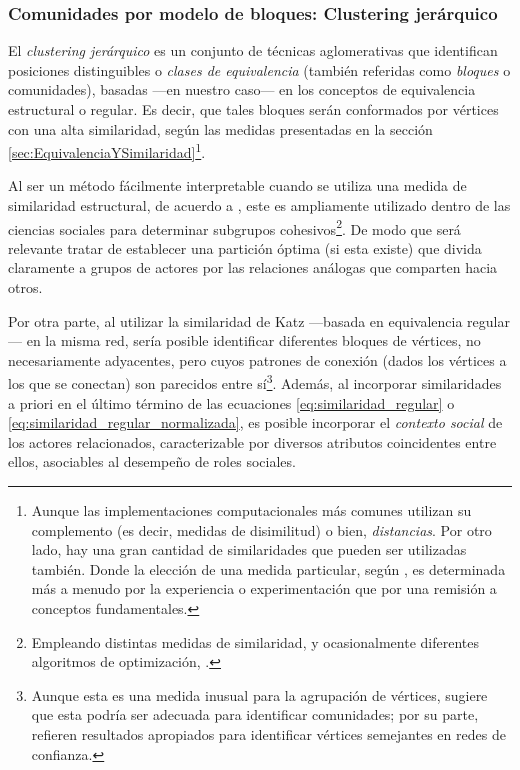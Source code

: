 \documentclass[letterpaper, 11pt]{book}
\theoremstyle{definition}
\theoremstyle{remark}
\begin{document}
\subsubsection{Comunidades por modelo de bloques: Clustering jerárquico}
\label{sec:ClasesEquivalentes}

El \emph{clustering jerárquico} es un conjunto de técnicas aglomerativas que identifican posiciones distinguibles o \emph{clases de equivalencia} (también referidas como \emph{bloques} o comunidades), basadas ---en nuestro caso--- en los conceptos de equivalencia estructural o regular. 
Es decir, que tales bloques serán conformados por vértices con una alta similaridad, según las medidas presentadas en la sección \ref{sec:EquivalenciaYSimilaridad}\footnote{
    Aunque las implementaciones computacionales más comunes utilizan su complemento (es decir, medidas de disimilitud) o bien, \emph{distancias}. 
    Por otro lado, hay una gran cantidad de similaridades que pueden ser utilizadas también. 
    Donde la elección de una medida particular, según \citet{2010_Newman_Networks}, es determinada más a menudo por la experiencia o experimentación que por una remisión a conceptos fundamentales. 
}. 


Al ser un método fácilmente interpretable cuando se utiliza una medida de similaridad estructural, de acuerdo a \citet{1994_Wasserman_SNA}, este es ampliamente utilizado dentro de las ciencias sociales para determinar subgrupos cohesivos\footnote{
    Empleando distintas medidas de similaridad, y ocasionalmente diferentes algoritmos de optimización, \citep[2]{2006_Newman_Similarity}.
}. 
De modo que será relevante tratar de establecer una partición óptima (si esta existe) que divida claramente a grupos de actores por las relaciones análogas que comparten hacia otros. 


Por otra parte, al utilizar la similaridad de Katz ---basada en equivalencia regular--- en la misma red, sería posible identificar diferentes bloques de vértices, no necesariamente adyacentes, pero cuyos patrones de conexión (dados los vértices a los que se conectan) son parecidos entre sí\footnote{
    Aunque esta es una medida inusual para la agrupación de vértices, \citet{2010_Newman_Networks} sugiere que esta podría ser adecuada para identificar comunidades; por su parte, \citet{2018_Duricic_RegularEquivalence} refieren resultados apropiados para identificar vértices semejantes en redes de confianza. 
}. 
Además, al incorporar similaridades a priori en el último término de las ecuaciones \ref{eq:similaridad_regular} o \ref{eq:similaridad_regular_normalizada}, es posible incorporar el \emph{contexto social} de los actores relacionados, caracterizable por diversos atributos coincidentes entre ellos, asociables al desempeño de roles sociales. 
\end{document}
